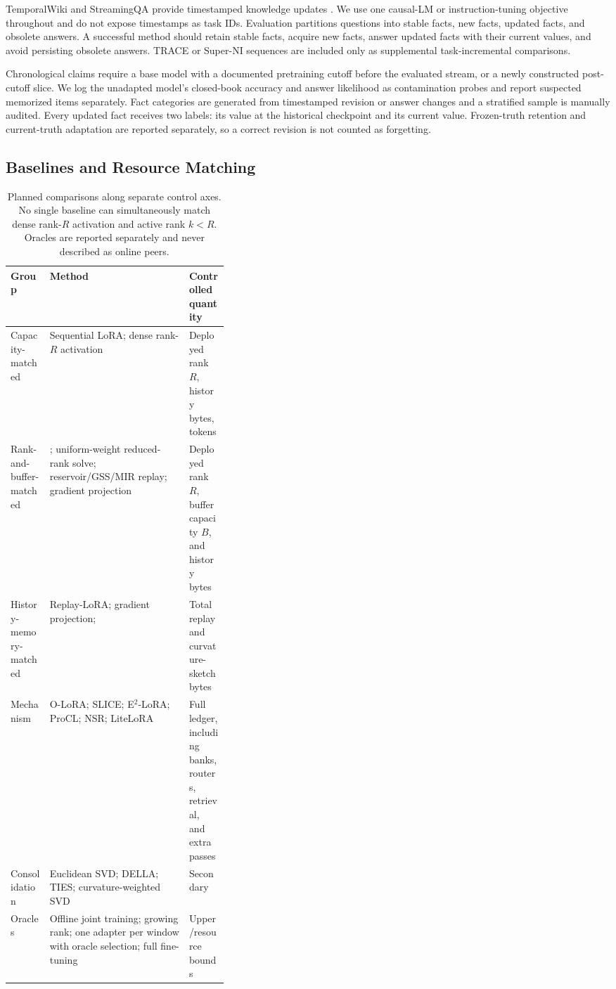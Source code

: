 TemporalWiki and StreamingQA provide timestamped knowledge updates
\citep{jang2022temporalwiki,liska2022streamingqa}. We use one causal-LM or
instruction-tuning objective throughout and do not expose timestamps as task
IDs. Evaluation partitions questions into stable facts, new facts, updated
facts, and obsolete answers. A successful method should retain stable facts,
acquire new facts, answer updated facts with their current values, and avoid
persisting obsolete answers. TRACE or Super-NI sequences are included only as
supplemental task-incremental comparisons.

Chronological claims require a base model with a documented pretraining cutoff
before the evaluated stream, or a newly constructed post-cutoff slice. We log
the unadapted model's closed-book accuracy and answer likelihood as
contamination probes and report suspected memorized items separately. Fact
categories are generated from timestamped revision or answer changes and a
stratified sample is manually audited. Every updated fact receives two labels:
its value at the historical checkpoint and its current value. Frozen-truth
retention and current-truth adaptation are reported separately, so a correct
revision is not counted as forgetting.

\subsection{Baselines and Resource Matching}

\begin{table}[t]
\caption{Planned comparisons along separate control axes. No single baseline
can simultaneously match dense rank-$R$ activation and active rank $k<R$.
Oracles are reported separately and never described as online peers.}
\label{tab:baseline-plan}
\centering
\small
\begin{tabularx}{\linewidth}{
  >{\raggedright\arraybackslash}p{0.18\linewidth}
  X
  >{\raggedright\arraybackslash}p{0.18\linewidth}}
\toprule
Group & Method & Controlled quantity \\
\midrule
Capacity-matched & Sequential LoRA; dense rank-$R$ activation & Deployed rank
$R$, history bytes, tokens \\
Rank-and-buffer-matched & \method{}; uniform-weight reduced-rank solve;
reservoir/GSS/MIR replay; gradient projection & Deployed rank $R$, buffer
capacity $B$, and history bytes \\
History-memory-matched & Replay-LoRA; gradient projection; \method{} &
Total replay and curvature-sketch bytes \\
Mechanism & O-LoRA; SLICE; E$^2$-LoRA; ProCL; NSR; LiteLoRA & Full ledger,
including banks, routers, retrieval, and extra passes \\
Consolidation & Euclidean SVD; DELLA; TIES; curvature-weighted SVD & Secondary \\
Oracles & Offline joint training; growing rank; one adapter per window with
oracle selection; full fine-tuning & Upper/resource bounds \\
\bottomrule
\end{tabularx}
\end{table}

